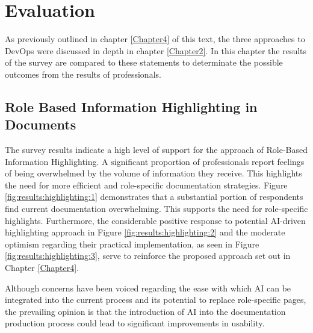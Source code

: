 


\chapter{Evaluation} %

\label{Chapter6} %

As previously outlined in chapter \ref{Chapter4} of this text, the three approaches to \ac{DevOps} were discussed in depth in chapter \ref{Chapter2}. In this chapter the results of the survey are compared to these statements to determinate the possible outcomes from the results of professionals.

\section{Role Based Information Highlighting in Documents}
The survey results indicate a high level of support for the approach of Role-Based Information Highlighting. A significant proportion of professionals report feelings of being overwhelmed by the volume of information they receive. This highlights the need for more efficient and role-specific documentation strategies. Figure \ref{fig:results:highlighting:1} demonstrates that a substantial portion of respondents find current documentation overwhelming. This supports the need for role-specific highlights. Furthermore, the considerable positive response to potential \ac{AI}-driven highlighting approach in Figure \ref{fig:results:highlighting:2} and the moderate optimism regarding their practical implementation, as seen in Figure \ref{fig:results:highlighting:3}, serve to reinforce the proposed approach set out in Chapter \ref{Chapter4}.

Although concerns have been voiced regarding the ease with which \ac{AI} can be integrated into the current process and its potential to replace role-specific pages, the prevailing opinion is that the introduction of \ac{AI} into the documentation production process could lead to significant improvements in usability.

